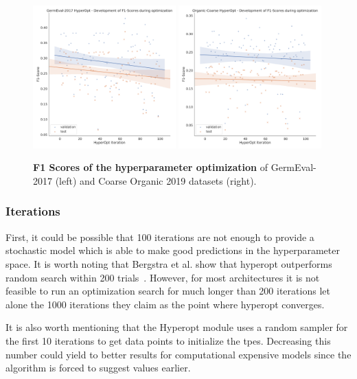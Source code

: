 \begin{figure}[ht]
	\centering
	\includegraphics[width=0.49\textwidth]{figures/06_results/06_hp_ge_lm_f1time}
	\includegraphics[width=0.49\textwidth]{figures/06_results/06_hp_og_lm_f1time}
	\caption{\textbf{F1 Scores of the hyperparameter optimization} of GermEval-2017 {(left)} and Coarse Organic 2019 datasets {(right)}.}
	\label{fig:06_F1GermEvalHp}
\end{figure}

\subsubsection*{Iterations}

First, it could be possible that 100 iterations are not enough to provide a stochastic model which is able to make good predictions in the hyperparameter space. It is worth noting that Bergstra et al. show that hyperopt outperforms random search within 200 trials~\cite{Bergstra2013}. However, for most architectures it is not feasible to run an optimization search for much longer than 200 iterations let alone the 1000 iterations they claim as the point where hyperopt converges. 
\medskip

It is also worth mentioning that the Hyperopt module uses a random sampler for the first 10 iterations to get data points to initialize the \glspl{tpe}. Decreasing this number could yield to better results for computational expensive models since the algorithm is forced to suggest values earlier.

